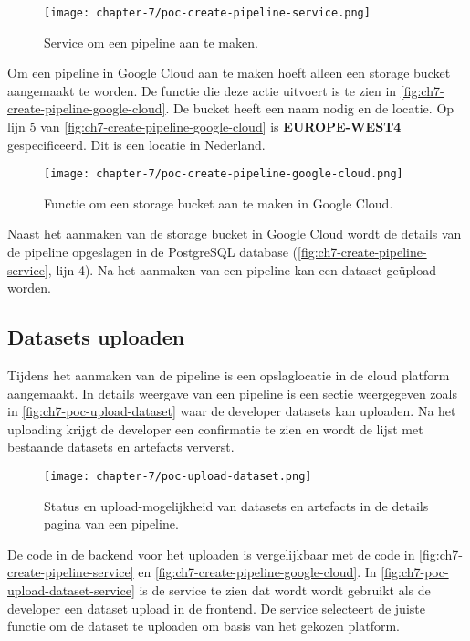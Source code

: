 \newpage

\begin{figure}[hbt!]
  \centering
  \texttt{[image: chapter-7/poc-create-pipeline-service.png]}
  \caption{Service om een pipeline aan te maken.}
  \label{fig:ch7-create-pipeline-service}
\end{figure}

Om een pipeline in Google Cloud aan te maken hoeft alleen een storage bucket aangemaakt te worden. De functie die deze actie uitvoert is te zien in \autoref{fig:ch7-create-pipeline-google-cloud}. De bucket heeft een naam nodig en de locatie. Op lijn 5 van \autoref{fig:ch7-create-pipeline-google-cloud} is \textbf{EUROPE-WEST4} gespecificeerd. Dit is een locatie in Nederland.

\begin{figure}[hbt!]
  \centering
  \texttt{[image: chapter-7/poc-create-pipeline-google-cloud.png]}
  \caption{Functie om een storage bucket aan te maken in Google Cloud.}
  \label{fig:ch7-create-pipeline-google-cloud}
\end{figure}

Naast het aanmaken van de storage bucket in Google Cloud wordt de details van de pipeline opgeslagen in de PostgreSQL database (\autoref{fig:ch7-create-pipeline-service}, lijn 4). Na het aanmaken van een pipeline kan een dataset geüpload worden.

\subsection{Datasets uploaden}\label{subsec:ch7-datasets-uploaden}
Tijdens het aanmaken van de pipeline is een opslaglocatie in de cloud platform aangemaakt. In details weergave van een pipeline is een sectie weergegeven zoals in \autoref{fig:ch7-poc-upload-dataset} waar de developer datasets kan uploaden. Na het uploading krijgt de developer een confirmatie te zien en wordt de lijst met bestaande datasets en artefacts ververst.

\newpage

\begin{figure}[hbt!]
  \centering
  \texttt{[image: chapter-7/poc-upload-dataset.png]}
  \caption{Status en upload-mogelijkheid van datasets en artefacts in de details pagina van een pipeline.}
  \label{fig:ch7-poc-upload-dataset}
\end{figure}

De code in de backend voor het uploaden is vergelijkbaar met de code in \autoref{fig:ch7-create-pipeline-service} en \autoref{fig:ch7-create-pipeline-google-cloud}. In \autoref{fig:ch7-poc-upload-dataset-service} is de service te zien dat wordt wordt gebruikt als de developer een dataset upload in de frontend. De service selecteert de juiste functie om de dataset te uploaden om basis van het gekozen platform.

